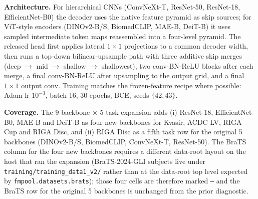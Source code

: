 \textbf{Architecture.} For hierarchical CNNs (ConvNeXt-T, ResNet-50, ResNet-18, EfficientNet-B0) the decoder uses the native feature pyramid as skip sources; for ViT-style encoders (DINOv2-B/S, BiomedCLIP, MAE-B, DeiT-B) it uses sampled intermediate token maps reassembled into a four-level pyramid. The released head first applies lateral $1{\times}1$ projections to a common decoder width, then runs a top-down bilinear-upsample path with three additive skip merges (deep $\to$ mid $\to$ shallow $\to$ shallowest), two conv-BN-ReLU blocks after each merge, a final conv-BN-ReLU after upsampling to the output grid, and a final $1{\times}1$ output conv. Training matches the frozen-feature recipe where possible: Adam lr $10^{-3}$, batch 16, 30 epochs, BCE, seeds $\{42,43\}$.

\textbf{Coverage.} The 9-backbone $\times$ 5-task expansion adds (i) ResNet-18, EfficientNet-B0, MAE-B and DeiT-B as four new backbones for Kvasir, ACDC LV, RIGA Cup and RIGA Disc, and (ii) RIGA Disc as a fifth task row for the original 5 backbones (DINOv2-B/S, BiomedCLIP, ConvNeXt-T, ResNet-50). The BraTS column for the four new backbones requires a different data-root layout on the host that ran the expansion (BraTS-2024-GLI subjects live under \texttt{training/training\_data1\_v2/} rather than at the data-root top level expected by \texttt{fmpool.datasets.brats}); those four cells are therefore marked \texttt{---} and the BraTS row for the original 5 backbones is unchanged from the prior diagnostic.

